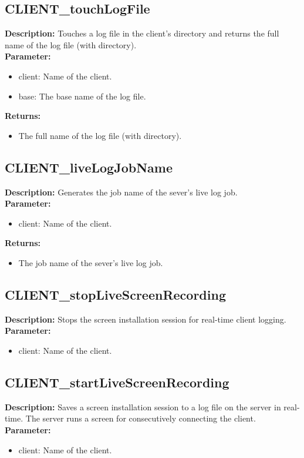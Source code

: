 \subsection{CLIENT\_touchLogFile}
\textbf{Description:} Touches a log file in the client's directory and returns the full name of the log file (with directory).\\
\textbf{Parameter:}
\begin{itemize}
\item client: Name of the client.
\item base: The base name of the log file.
\end{itemize}
\textbf{Returns:}
\begin{itemize}
\item The full name of the log file (with directory).
\end{itemize}

\subsection{CLIENT\_liveLogJobName}
\textbf{Description:} Generates the job name of the sever's live log job.\\
\textbf{Parameter:}
\begin{itemize}
\item client: Name of the client.
\end{itemize}
\textbf{Returns:}
\begin{itemize}
\item The job name of the sever's live log job.
\end{itemize}

\subsection{CLIENT\_stopLiveScreenRecording}
\textbf{Description:} Stops the screen installation session for real-time client logging.\\
\textbf{Parameter:}
\begin{itemize}
\item client: Name of the client.
\end{itemize}

\subsection{CLIENT\_startLiveScreenRecording}
\textbf{Description:} Saves a screen installation session to a log file on the server in real-time. The server runs a screen for consecutively connecting the client.\\
\textbf{Parameter:}
\begin{itemize}
\item client: Name of the client.
\end{itemize}

